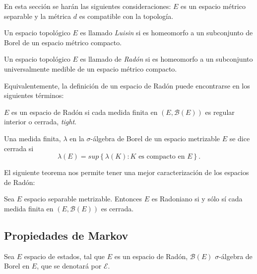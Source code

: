 En esta secci\'on se har\'an las siguientes consideraciones: $E$
es un espacio m\'etrico separable y la m\'etrica $d$ es compatible
con la topolog\'ia.


\begin{Def}
Un espacio topol\'ogico $E$ es llamado {\em Luisin} si es
homeomorfo a un subconjunto de Borel de un espacio m\'etrico
compacto.
\end{Def}

\begin{Def}
Un espacio topol\'ogico $E$ es llamado de {\em Rad\'on} si es
homeomorfo a un subconjunto universalmente medible de un espacio
m\'etrico compacto.
\end{Def}

Equivalentemente, la definici\'on de un espacio de Rad\'on puede
encontrarse en los siguientes t\'erminos:


\begin{Def}
$E$ es un espacio de Rad\'on si cada medida finita en
$\left(E,\mathcal{B}\left(E\right)\right)$ es regular interior o cerrada,
{\em tight}.
\end{Def}

\begin{Def}
Una medida finita, $\lambda$ en la $\sigma$-\'algebra de Borel de
un espacio metrizable $E$ se dice cerrada si
\begin{equation}\label{Eq.A2.3}
\lambda\left(E\right)=sup\left\{\lambda\left(K\right):K\textrm{ es
compacto en }E\right\}.
\end{equation}
\end{Def}

El siguiente teorema nos permite tener una mejor caracterizaci\'on de los espacios de Rad\'on:
\begin{Teo}\label{Tma.A2.2}
Sea $E$ espacio separable metrizable. Entonces $E$ es Radoniano si y s\'olo s\'i cada medida finita en $\left(E,\mathcal{B}\left(E\right)\right)$ es cerrada.
\end{Teo}

\subsection{Propiedades de Markov}

Sea $E$ espacio de estados, tal que $E$ es un espacio de Rad\'on, $\mathcal{B}\left(E\right)$ $\sigma$-\'algebra de Borel en $E$, que se denotar\'a por $\mathcal{E}$.


